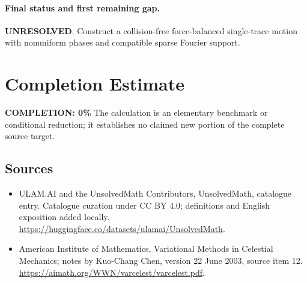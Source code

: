 \documentclass[11pt]{article}
\begin{document}
\paragraph{Final status and first remaining gap.}
\textbf{UNRESOLVED}. Construct a collision-free force-balanced single-trace motion with nonuniform phases and compatible sparse Fourier support.

\section{Completion Estimate}
\noindent\textbf{COMPLETION: 0\%}
The calculation is an elementary benchmark or conditional reduction; it establishes no claimed new portion of the complete source target.

\subsection{Sources}
\begin{itemize}
\item[\hypertarget{source:statement:1}{S1}] ULAM.AI and the UnsolvedMath Contributors, UnsolvedMath, catalogue entry. Catalogue curation under CC BY 4.0; definitions and English exposition added locally.
\url{https://huggingface.co/datasets/ulamai/UnsolvedMath}.
\item[\hypertarget{source:statement:2}{S2}] American Institute of Mathematics, Variational Methods in Celestial Mechanics; notes by Kuo-Chang Chen, version 22 June 2003, source item 12.
\url{https://aimath.org/WWN/varcelest/varcelest.pdf}.
\end{itemize}
\label{end:statement}
\end{document}
